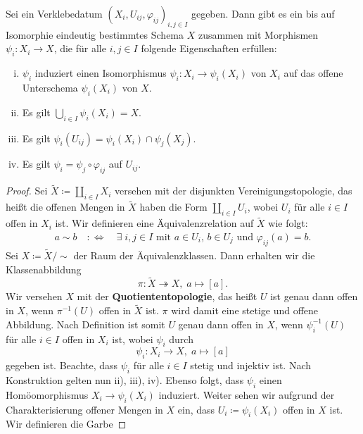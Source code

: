 \begin{lem}
\label{lem:5.10}
	Sei ein Verklebedatum $(X_i,U_{ij},\varphi_{ij})_{i,j\in I}$ gegeben. Dann gibt es ein bis auf Isomorphie eindeutig bestimmtes Schema $X$ zusammen mit Morphismen $\psi_i \colon X_i \to X$, die für alle $i,j \in I$ folgende Eigenschaften erfüllen:
	\begin{enumerate}[i)]
		\item $\psi_i$ induziert einen Isomorphismus $\psi_i \colon X_i \to \psi_i(X_i)$ von $X_i$ auf das offene Unterschema $\psi_i(X_i)$ von $X$.
		\item Es gilt $\bigcup_{i \in I} \psi_i(X_i) = X$.
		\item Es gilt $\psi_i(U_{ij}) = \psi_i(X_i) \cap \psi_j(X_j)$.
		\item Es gilt $\psi_i = \psi_j \circ \varphi_{ij}$ auf $U_{ij}$.
	\end{enumerate}
	\begin{proof}
		Sei $\widetilde{X} \coloneqq \coprod_{i\in I}X_i$ versehen mit der disjunkten Vereinigungstopologie, das heißt die offenen Mengen in $\widetilde{X}$ haben die Form $\coprod_{i\in I} U_i$, wobei $U_i$ für alle $i \in I$ offen in $X_i$ ist. Wir definieren eine Äquivalenzrelation auf $\widetilde{X}$ wie folgt:
		\begin{align*}
			a \sim b \quad:\Longleftrightarrow\quad \exists \;i,j \in I \text{ mit } a \in U_i,\, b \in U_j \text{ und } \varphi_{ij}(a) = b .
		\end{align*}
                Sei $X \coloneqq \widetilde{X}/{\sim}$ der Raum der Äquivalenzklassen. Dann erhalten wir die Klassenabbildung
		\[
			\pi\colon \widetilde{X} \twoheadrightarrow X,\; a \mapsto [a].
		\]
		Wir versehen $X$ mit der \textbf{Quotiententopologie}, das heißt $U$ ist genau dann offen in $X$, wenn $\pi^{-1}(U)$ offen in $\widetilde{X}$ ist. $\pi$ wird damit eine stetige und offene Abbildung. Nach Definition ist somit $U$ genau dann offen in $X$, wenn $\psi_i^{-1}(U)$ für alle $i \in I$ offen in $X_i$ ist, wobei $\psi_i$ durch
		\[
			\psi_i\colon X_i \to X,\; a \mapsto [a]
		\]
		gegeben ist. Beachte, dass $\psi_i$ für alle $i \in I$ stetig und injektiv ist. Nach Konstruktion gelten nun ii), iii), iv). Ebenso folgt, dass $\psi_i$ einen Homöomorphismus $X_i \to \psi_i(X_i)$ induziert. Weiter sehen wir aufgrund der Charakterisierung offener Mengen in $X$ ein, dass $U_i\coloneqq \psi_i(X_i)$ offen in $X$ ist. Wir definieren die Garbe

\end{proof}
\end{lem}
